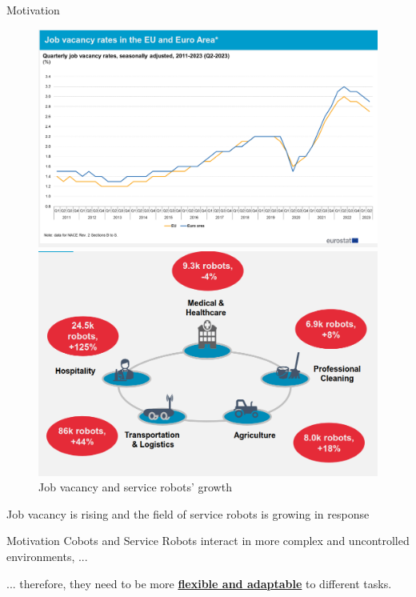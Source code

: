 \begin{frame}{Motivation}
  \begin{figure}[ht]
    \begin{minipage}[b]{0.49\linewidth}
        \centering
        \includegraphics[width=\textwidth, height=0.7\textwidth]{img/job_vacancy.png}
    \end{minipage}
    \begin{minipage}[b]{0.49\linewidth}
        \centering
        \includegraphics[width=\textwidth]{img/service_robots.png}
    \end{minipage}
    \caption{Job vacancy and service robots' growth\footnotemark[1]}
  \end{figure}
  Job vacancy is rising and the field of service robots is growing in response
  
\end{frame}
\begin{frame}{Motivation}
  Cobots and Service Robots interact in more complex and uncontrolled environments, ...

  \pause
  ... therefore, they need to be more \textbf{\underline{flexible and adaptable}} to different tasks.

\end{frame}
